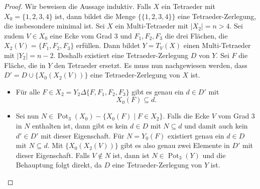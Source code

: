 \documentclass[12pt,titlepage,twoside,cleardoublepage]{article}
\theoremstyle{nummermitklammern}
\numberwithin{equation}{section}
\DeclareMathOperator{\Pot}{Pot}
\begin{document}
\begin{proof}
Wir beweisen die Aussage induktiv. Falls $X$ ein Tetraeder mit $X_0=\{1,2,3,4\}$ ist, dann bildet die Menge $\{\{1,2,3,4\}\}$ eine Tetraeder-Zerlegung, die insbesondere minimal ist.
Sei $X$ ein Multi-Tetraeder mit $\vert X_2\vert =n > 4.$ Sei zudem $V\in X_0$ eine Ecke vom Grad 3 und $F_1,F_2,F_3$ die drei Flächen, die $X_2(V)=\{F_1,F_2,F_3\}$ erfüllen.  Dann bildet $Y=T_V(X)$ einen Multi-Tetraeder mit $\vert Y_2 \vert =n-2.$ Deshalb existiert eine Tetraeder-Zerlegung $D$ von $Y.$ Sei $F$ die Fläche, die in $Y$ den Tetraeder ersetzt. Es muss nun nachgewiesen werden, dass $D'=D\cup \{X_0(X_2(V))\}$ eine Tetraeder-Zerlegung von $X$ ist.
\begin{itemize}
\item Für alle $F\in X_2= Y_2 \Delta\{F,F_1,F_2,F_3\}$ gibt es genau ein $d\in D'$ mit 
\[
X_0(F)\subseteq d.
\] 
\item Sei nun $N\in \Pot_3(X_0)-\{X_0(F)\mid F\in X_2\}.$ Falls die Ecke $V$ vom Grad 3 in $N$ enthalten ist, 
dann gibt es kein $d\in D$ mit $N\subseteq d$ und damit auch kein $d'\in D'$ mit dieser Eigenschaft. Für $N=Y_0(F)$ existiert genau ein $d \in D$ mit $N\subseteq d.$ Mit $\{X_0(X_2(V))\}$ gibt es also genau zwei Elemente in $D'$ mit dieser Eigenschaft. Falls $V\notin N$ ist, dann ist $N\in \Pot_3(Y)$ und die Behauptung folgt direkt, da $D$ eine Tetraeder-Zerlegung von $Y$ ist.
\end{itemize}
\end{proof}
\end{document}
